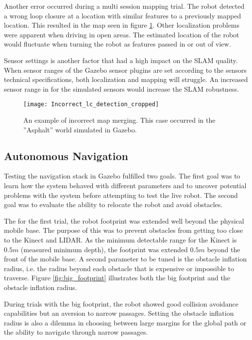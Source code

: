 Another error occurred during a multi session mapping trial. The robot detected a wrong loop closure at a location with similar features to a previously mapped location. This resulted in the map seen in figure \ref{fig:Incorrect_lc_detection}. Other localization problems were apparent when driving in open areas. The estimated location of the robot would fluctuate when turning the robot as features passed in or out of view.

Sensor settings is another factor that had a high impact on the \ac{SLAM} quality. When sensor ranges of the Gazebo sensor plugins are set according to the sensors technical specifications, both localization and mapping will struggle. An increased sensor range in for the simulated sensors would increase the \ac{SLAM} robustness.

\begin{figure}[h]
	\centering
	\texttt{[image: Incorrect\_lc\_detection\_cropped]}
	\caption{An example of incorrect map merging. This case occurred in the ''Asphalt'' world simulated in Gazebo.}
	\label{fig:Incorrect_lc_detection}
\end{figure}


\subsection{Autonomous Navigation}

Testing the navigation stack in Gazebo fulfilled two goals. The first goal was to learn how the system behaved with different parameters and to uncover potential problems with the system before attempting to test the live robot. The second goal was to evaluate the ability to relocate the robot and avoid obstacles. 

The for the first trial, the robot footprint was extended well beyond the physical mobile base. The purpose of this was to prevent obstacles from getting too close to the Kinect and \ac{LIDAR}. As the minimum detectable range for the Kinect is $0.5 m$ (measured minimum depth), the footprint was extended $0.5 m$ beyond the front of the mobile base. A second parameter to be tuned is the obstacle inflation radius, i.e. the radius beyond each obstacle that is expensive or impossible to traverse. Figure \ref{fig:big_footprint} illustrates both the big footprint and the obstacle inflation radius.

During trials with the big footprint, the robot showed good collision avoidance capabilities but an aversion to narrow passages. Setting the obstacle inflation radius is also a dilemma in choosing between large margins for the global path or the ability to navigate through narrow passages. 

